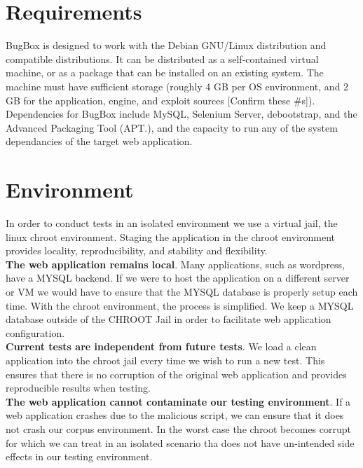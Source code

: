 \documentclass[letterpaper,twocolumn,10pt]{article}
\begin{document}
\section{Requirements}

BugBox is designed to work with the Debian GNU/Linux distribution and compatible distributions.  It can be distributed as a self-contained virtual machine, or as a package that can be installed on an existing system. The machine must have sufficient storage (roughly 4 GB per OS environment, and 2 GB for the application, engine, and exploit sources [Confirm these \#s]).  Dependencies for BugBox include MySQL,  Selenium Server, debootstrap, and the Advanced Packaging Tool (APT.), and the capacity to run any of the system dependancies of the target web application.\\

\section{Environment}

In order to conduct tests in an isolated environment we use a virtual jail, the linux chroot environment.  Staging the application in the chroot environment provides locality, reproducibility, and stability and flexibility.\\

{\bf The web application remains local}.  Many applications, such as wordpress, have a MYSQL backend.  If we were to host the application on a different server or VM we would have to ensure that the MYSQL database is properly setup each time.  With the chroot environment, the process is simplified. We keep a MYSQL database outside of the CHROOT Jail in order to facilitate web application configuration.  \\

{\bf Current tests are independent from future tests}.  We load a clean application into the chroot jail every time we wish to run a new test.  This ensures that there is no corruption of the original web application and provides reproducible results when testing.\\

{\bf The web application cannot contaminate our testing environment}.  If a web application crashes due to the malicious script, we can ensure that it does not crash our corpus environment.  In the worst case the chroot becomes corrupt for which we can treat in an isolated scenario tha does not have un-intended side effects in our testing environment.  \\
\end{document}
